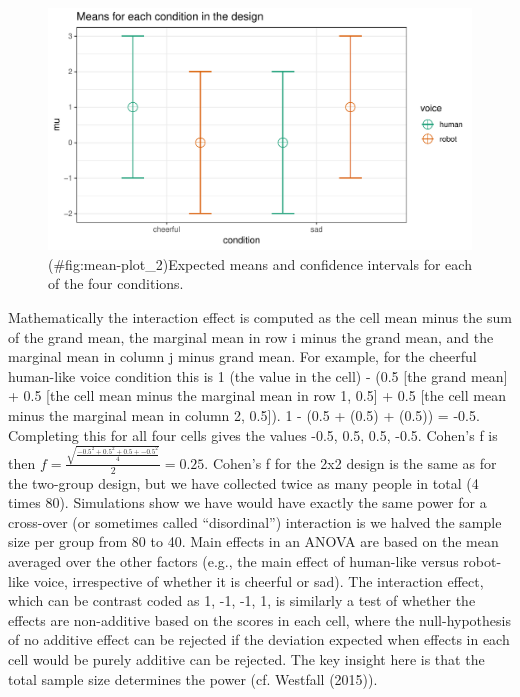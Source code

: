 \documentclass[,man,floatsintext]{apa6}
\begin{document}
\begin{figure}
\centering
\includegraphics{0.1_Simulation_Based_Power_Analysis_For_Factorial_ANOVA_Designs_files/figure-latex/mean-plot_2-1.pdf}
\caption{(\#fig:mean-plot\_2)Expected means and confidence intervals for
each of the four conditions.}
\end{figure}

Mathematically the interaction effect is computed as the cell mean minus
the sum of the grand mean, the marginal mean in row i minus the grand
mean, and the marginal mean in column j minus grand mean. For example,
for the cheerful human-like voice condition this is 1 (the value in the
cell) - (0.5 {[}the grand mean{]} + 0.5 {[}the cell mean minus the
marginal mean in row 1, 0.5{]} + 0.5 {[}the cell mean minus the marginal
mean in column 2, 0.5{]}). 1 - (0.5 + (0.5) + (0.5)) = -0.5. Completing
this for all four cells gives the values -0.5, 0.5, 0.5, -0.5. Cohen's f
is then
\(f = \frac { \sqrt { \frac { -0.5^2 + 0.5^2 + 0.5 + -0.5^2 } { 4 } }}{ 2 } = 0.25\).
Cohen's f for the 2x2 design is the same as for the two-group design,
but we have collected twice as many people in total (4 times 80).
Simulations show we have would have exactly the same power for a
cross-over (or sometimes called \enquote{disordinal}) interaction is we
halved the sample size per group from 80 to 40. Main effects in an ANOVA
are based on the mean averaged over the other factors (e.g., the main
effect of human-like versus robot-like voice, irrespective of whether it
is cheerful or sad). The interaction effect, which can be contrast coded
as 1, -1, -1, 1, is similarly a test of whether the effects are
non-additive based on the scores in each cell, where the null-hypothesis
of no additive effect can be rejected if the deviation expected when
effects in each cell would be purely additive can be rejected. The key
insight here is that the total sample size determines the power (cf.
Westfall (2015)).
\end{document}
